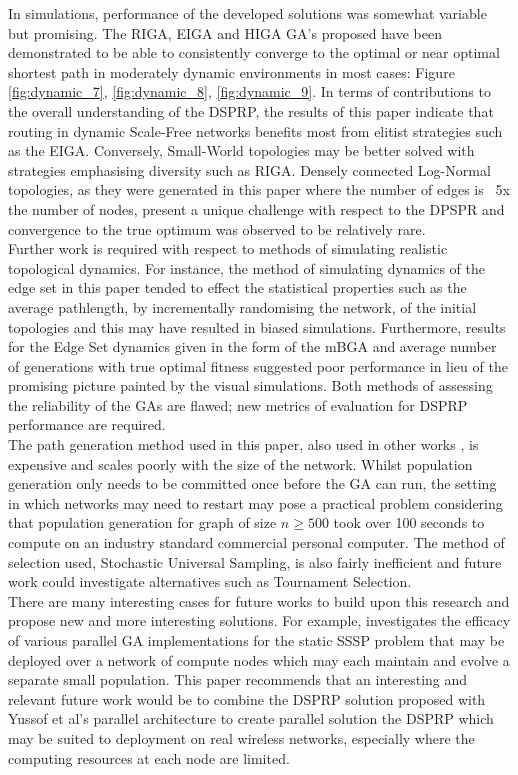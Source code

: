 \documentclass[
	a4paper, %
	10pt, %
	unnumberedsections, %
	twoside, %
]{LTJournalArticle}
\begin{document}
In simulations, performance of the developed solutions was somewhat variable but promising. The RIGA, EIGA and HIGA GA's proposed have been demonstrated to be able to consistently converge to the optimal or near optimal shortest path in moderately dynamic environments in most cases: Figure \ref{fig:dynamic_7}, \ref{fig:dynamic_8}, \ref{fig:dynamic_9}. In terms of contributions to the overall understanding of the DSPRP, the results of this paper indicate that routing in dynamic Scale-Free networks benefits most from elitist strategies such as the EIGA. Conversely, Small-World topologies may be better solved with strategies emphasising diversity such as RIGA. Densely connected Log-Normal topologies, as they were generated in this paper where the number of edges is ~5x the number of nodes, present a unique challenge with respect to the DPSPR and convergence to the true optimum was observed to be relatively rare. \\ 

Further work is required with respect to methods of simulating realistic topological dynamics. For instance, the method of simulating dynamics of the edge set in this paper tended to effect the statistical properties such as the average pathlength, by incrementally randomising the network, of the initial topologies and this may have resulted in biased simulations. Furthermore, results for the Edge Set dynamics given in the form of the mBGA and average number of generations with true optimal fitness suggested poor performance in lieu of the promising picture painted by the visual simulations. Both methods of assessing the reliability of the GAs are flawed; new metrics of evaluation for DSPRP performance are required. \\ 

The path generation method used in this paper, also used in other works \cite{yang:10} \cite{kumar:10} \cite{yussof:09}, is expensive and scales poorly with the size of the network. Whilst population generation only needs to be committed once before the GA can run, the setting in which networks may need to restart may pose a practical problem considering that population generation for graph of size \(n \geq 500\) took over 100 seconds to compute on an industry standard commercial personal computer. The method of selection used, Stochastic Universal Sampling, is also fairly inefficient and future work could investigate  alternatives such as Tournament Selection. \\

There are many interesting cases for future works to build upon this research and propose new and more interesting solutions. For example, \cite{yussof:09} investigates the efficacy of various parallel GA implementations for the static SSSP problem that may be deployed over a network of compute nodes which may each maintain and evolve a separate small population. This paper recommends that an interesting and relevant future work would be to combine the DSPRP solution proposed with Yussof et al's parallel architecture to create parallel solution the DSPRP which may be suited to deployment on real wireless networks, especially where the computing resources at each node are limited. \\
\end{document}
